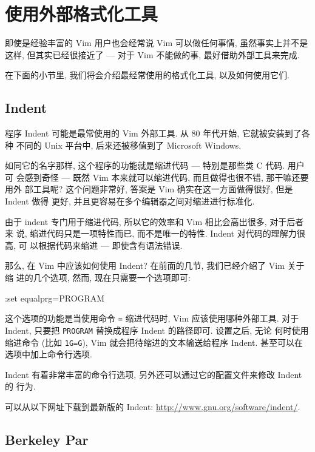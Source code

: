 \section{使用外部格式化工具}
\label{sec:using_external_formatting_tools}

即使是经验丰富的 Vim 用户也会经常说 Vim 可以做任何事情, 虽然事实上并不是这样,
但其实已经很接近了 --- 对于 Vim 不能做的事, 最好借助外部工具来完成.

在下面的小节里, 我们将会介绍最经常使用的格式化工具, 以及如何使用它们.

\subsection{Indent}
\label{subsec:indent}

程序 Indent 可能是最常使用的 Vim 外部工具. 从 80 年代开始, 它就被安装到了各种
不同的 Unix 平台中, 后来还被移值到了 Microsoft Windows.

如同它的名字那样, 这个程序的功能就是缩进代码 --- 特别是那些类 C 代码. 用户可
会感到奇怪 --- 既然 Vim 本来就可以缩进代码, 而且做得也很不错, 那干嘛还要用外
部工具呢? 这个问题非常好, 答案是 Vim 确实在这一方面做得很好, 但是 Indent 做得
更好, 并且更容易在多个编辑器之间对缩进进行标准化.

由于 indent 专门用于缩进代码, 所以它的效率和 Vim 相比会高出很多, 对于后者来
说, 缩进代码只是一项特性而已, 而不是唯一的特性. Indent 对代码的理解力很高, 可
以根据代码来缩进 --- 即使含有语法错误.

那么, 在 Vim 中应该如何使用 Indent? 在前面的几节, 我们已经介绍了 Vim 关于缩
进的几个选项, 然而, 现在只需要一个选项即可:
\begin{vimcode}
:set equalprg=PROGRAM
\end{vimcode}

这个选项的功能是当使用命令 \texttt{=} 缩进代码时, Vim 应该使用哪种外部工具.
对于
Indent, 只要把 \texttt{PROGRAM} 替换成程序 Indent 的路径即可. 设置之后, 无论
何时使用缩进命令 (比如 \texttt{1G=G}), Vim 就会把待缩进的文本输送给程序
Indent. 甚至可以在选项中加上命令行选项.

Indent 有着非常丰富的命令行选项, 另外还可以通过它的配置文件来修改 Indent 的
行为.

\begin{warning}
    可以从以下网址下载到最新版的 Indent:
    \url{http://www.gnu.org/software/indent/}.
\end{warning}

\subsection{Berkeley Par}
\label{subsec:berkeley_par}

